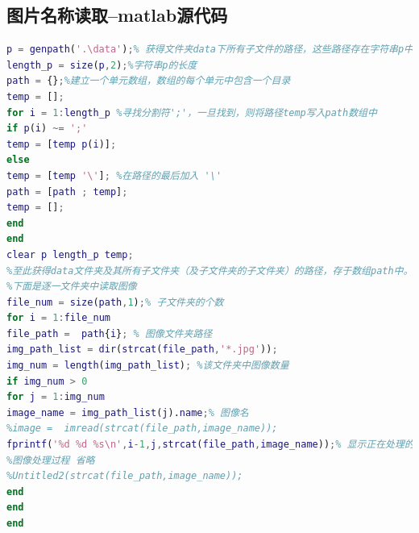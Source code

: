 \documentclass{whutmod}
\begin{document}
\subsection{图片名称读取--matlab源代码}
\begin{lstlisting}[language=matlab]
p = genpath('.\data');% 获得文件夹data下所有子文件的路径，这些路径存在字符串p中，以';'分割
length_p = size(p,2);%字符串p的长度
path = {};%建立一个单元数组，数组的每个单元中包含一个目录
temp = [];
for i = 1:length_p %寻找分割符';'，一旦找到，则将路径temp写入path数组中
if p(i) ~= ';'
temp = [temp p(i)];
else 
temp = [temp '\']; %在路径的最后加入 '\'
path = [path ; temp];
temp = [];
end
end  
clear p length_p temp;
%至此获得data文件夹及其所有子文件夹（及子文件夹的子文件夹）的路径，存于数组path中。
%下面是逐一文件夹中读取图像
file_num = size(path,1);% 子文件夹的个数
for i = 1:file_num
file_path =  path{i}; % 图像文件夹路径
img_path_list = dir(strcat(file_path,'*.jpg'));
img_num = length(img_path_list); %该文件夹中图像数量
if img_num > 0
for j = 1:img_num
image_name = img_path_list(j).name;% 图像名
%image =  imread(strcat(file_path,image_name));
fprintf('%d %d %s\n',i-1,j,strcat(file_path,image_name));% 显示正在处理的路径和图像名
%图像处理过程 省略
%Untitled2(strcat(file_path,image_name));
end
end
end
\end{lstlisting}
\end{document}
